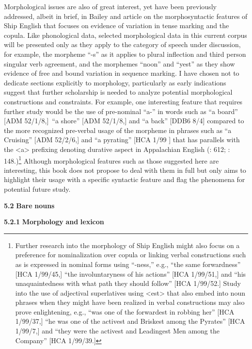 Morphological issues are also of great interest, yet have been previously addressed, albeit in brief, in Bailey and  article on the morphosyntactic features of Ship English that focuses on evidence of variation in tense marking and the copula. Like phonological data, selected morphological data in this current corpus will be presented only as they apply to the category of speech under discussion, for example, the morpheme “-s” as it applies to plural inflection and third person singular verb agreement, and the morphemes “noon” and “yest” as they show evidence of free and bound variation in sequence marking. I have chosen not to dedicate sections explicitly to morphology, particularly as early indications suggest that further scholarship is needed to analyze potential morphological constructions and constraints. For example, one interesting feature that requires further study would be the use of pre-nominal “a-” in words such as “a board” [ADM 52/1/8,]~“a shore” [ADM 52/1/8,] and “a back” [DDB6 8/4] compared to the more recognized pre-verbal usage of the morpheme in phrases such as “a Cruising” [ADM 52/2/6,] and “a pyrating” [HCA 1/99 \citealt{Barbados1733}] that has parallels with the <a> prefixing denoting durative aspect in Appalachian English (\citealt{Hickey2004}: 612; \citealt{Montgomery2001}: 148.)\footnote{Further research into the morphology of Ship English might also focus on a preference for nominalization over copula or linking verbal constructions such as is expressed in nominal forms using “-ness,” e.g., “the same forwardness” [HCA 1/99/45,] “the involuntaryness of his actions” [HCA 1/99/51,] and “his unaquaintedness with what path they should follow” [HCA 1/99/52.] Study into the use of adjectival superlatives using <est> that also embed into noun phrases when they might have been realized in verbal constructions may also prove enlightening, e.g., “was one of the forwardest in robbing her” [HCA 1/99/37,] “he was one of the activest and Briskest among the Pyrates” [HCA 1/99/7,] and “they were the activest and Leadingest Men among the Company” [HCA 1/99/39.]} Although morphological features such as those suggested here are interesting, this book does not propose to deal with them in full but only aims to highlight their usage with a specific syntactic feature and flag the phenomena for potential future study. 

\textbf{5.2} \textbf{Bare} \textbf{nouns}

  \textbf{5.2.1} \textbf{Morphology} \textbf{and} \textbf{lexicon}

